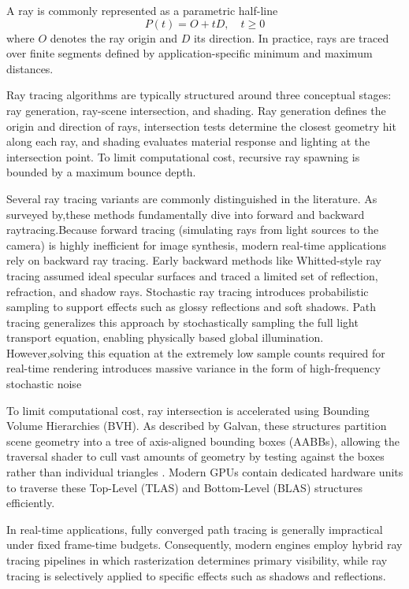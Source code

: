 \documentclass[12pt,a4paper]{report}
\begin{document}
A ray is commonly represented as a parametric half-line
\[
P(t) = O + tD,\quad t \ge 0
\]
where \(O\) denotes the ray origin and \(D\) its direction.\cite{shirley2024raytracing} In practice, rays
are traced over finite segments defined by application-specific minimum and
maximum distances.

Ray tracing algorithms are typically structured around three conceptual stages:
ray generation, ray-scene intersection, and shading. Ray generation defines the
origin and direction of rays, intersection tests determine the closest geometry
hit along each ray, and shading evaluates material response and lighting at the
intersection point. To limit computational cost, recursive ray spawning is
bounded by a maximum bounce depth.

Several ray tracing variants are commonly distinguished in the literature.
As surveyed by\cite{qu2023raytracing},these methods fundamentally dive into forward and backward raytracing.Because forward tracing (simulating rays from light sources to the camera)
is highly inefficient for image synthesis, modern real-time applications rely on backward ray tracing.
Early backward methods like Whitted-style ray tracing assumed ideal specular surfaces and traced a limited set of reflection,
refraction, and shadow rays. Stochastic ray tracing introduces probabilistic sampling to support effects such as glossy reflections and soft shadows.
Path tracing generalizes this approach by stochastically sampling the full light transport equation, enabling physically based global illumination.\cite{pharr2023pbr}
However,solving this equation at the extremely low sample counts required for real-time rendering introduces massive variance in the form of high-frequency stochastic noise\cite{wester2020}

To limit computational cost, ray intersection is accelerated using Bounding Volume Hierarchies (BVH).
As described by Galvan, these structures partition scene geometry into a tree of axis-aligned bounding boxes (AABBs),
allowing the traversal shader to cull vast amounts of geometry by testing against the boxes rather than individual triangles \cite{galvan2025}.
Modern GPUs contain dedicated hardware units to traverse these Top-Level (TLAS) and Bottom-Level (BLAS) structures efficiently.

In real-time applications, fully converged path tracing is generally
impractical under fixed frame-time budgets. Consequently, modern engines employ
hybrid ray tracing pipelines in which rasterization determines primary
visibility, while ray tracing is selectively applied to specific effects such
as shadows and reflections.\cite{haines2019raytracinggems}
\end{document}
